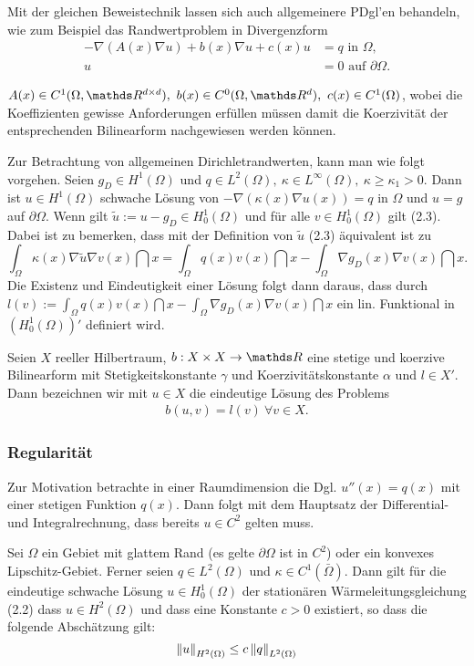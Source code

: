 Mit der gleichen Beweistechnik lassen sich auch allgemeinere PDgl'en behandeln, wie zum Beispiel das Randwertproblem in Divergenzform
\begin{align*}
-\nabla (A(x)\nabla u) +b(x)\nabla u + c(x) u &= q \text{ in } \Omega,\\
u &= 0 \text{ auf } \partial\Omega.
\end{align*}

$A(x) \in C^1(\Omega,\R^{d\times d}),~b(x)\in C^0(\Omega,\R^d),~c(x)\in C^1(\Omega)$, wobei die Koeffizienten gewisse Anforderungen erfüllen müssen damit die Koerzivität der entsprechenden Bilinearform nachgewiesen werden können.

Zur Betrachtung von allgemeinen Dirichletrandwerten, kann man wie folgt vorgehen.
Seien $g_D\in H^1(\Omega)$ und $q\in L^2(\Omega),~\kappa\in L^\infty(\Omega),~\kappa\ge \kappa_1 >0$. 
Dann ist $u\in H^1(\Omega)$ schwache Lösung von $-\nabla(\kappa(x)\nabla u(x)) = q$ in $\Omega$ und $u=g$ auf $\partial\Omega$.
Wenn gilt $\tilde{u}:= u-g_D \in H_0^1(\Omega)$ und für alle $v\in H_0^1(\Omega)$ gilt (2.3).
Dabei ist zu bemerken, dass mit der Definition von $\tilde{u}$ (2.3) äquivalent ist zu 
\[
\int_{\Omega} \kappa(x)\nabla \tilde{u} \nabla v(x)\dint x = \int_\Omega q(x) v(x)\dint x - \int_\Omega \nabla g_D(x) \nabla v(x) \dint x.
\]
Die Existenz und Eindeutigkeit einer Lösung folgt dann daraus, dass durch $l(v) := \int_\Omega q(x) v(x)\dint x - \int_\Omega \nabla g_D(x) \nabla v(x) \dint x$ ein lin. Funktional in $(H_0^1(\Omega))'$ definiert wird.

Seien $X$ reeller Hilbertraum, $b:X\times X\to \R$ eine stetige und koerzive Bilinearform mit Stetigkeitskonstante $\gamma$ und Koerzivitätskonstante $\alpha$ und $l\in X'$.
Dann bezeichnen wir mit $u\in X$ die eindeutige Lösung des Problems
\begin{align}
b(u,v) = l(v) ~\forall v\in X.
\end{align}

\subsubsection{Regularität}
Zur Motivation betrachte in einer Raumdimension die Dgl. $u''(x) = q(x)$ mit einer stetigen Funktion $q(x)$.
Dann folgt mit dem Hauptsatz der Differential- und Integralrechnung, dass bereits $u\in C^2$ gelten muss.

Sei $\Omega$ ein Gebiet mit glattem Rand (es gelte $\partial\Omega$ ist in $C^2$) oder ein konvexes Lipschitz-Gebiet.
Ferner seien $q\in L^2(\Omega)$ und $\kappa\in C^1(\bar{\Omega})$.
Dann gilt für die eindeutige schwache Lösung $u\in H_0^1(\Omega)$ der stationären Wärmeleitungsgleichung (2.2) dass $u\in H^2(\Omega)$ und dass eine Konstante $c>0$ existiert, so dass die folgende Abschätzung gilt:
\[
\left\Vert u\right\Vert_{H^2(\Omega)} \le c\left\Vert q\right\Vert_{L^2(\Omega)}
\]

